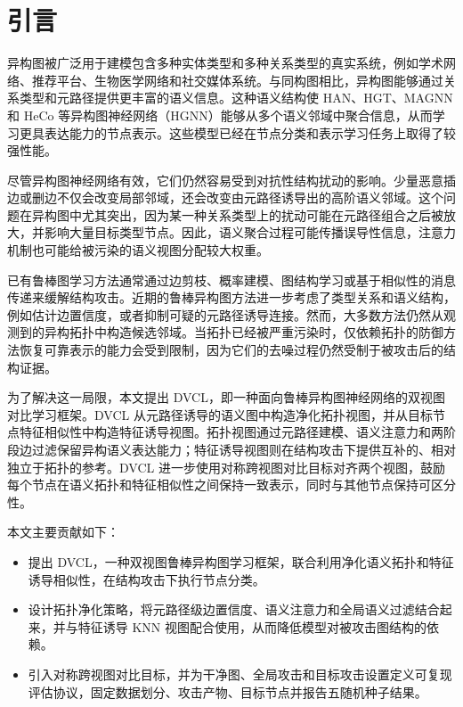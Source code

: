 \section{引言}
\label{sec:introduction-zh}

异构图被广泛用于建模包含多种实体类型和多种关系类型的真实系统，例如学术网络、推荐平台、生物医学网络和社交媒体系统。与同构图相比，异构图能够通过关系类型和元路径提供更丰富的语义信息。这种语义结构使 HAN、HGT、MAGNN 和 HeCo 等异构图神经网络（HGNN）能够从多个语义邻域中聚合信息，从而学习更具表达能力的节点表示。这些模型已经在节点分类和表示学习任务上取得了较强性能。

尽管异构图神经网络有效，它们仍然容易受到对抗性结构扰动的影响。少量恶意插边或删边不仅会改变局部邻域，还会改变由元路径诱导出的高阶语义邻域。这个问题在异构图中尤其突出，因为某一种关系类型上的扰动可能在元路径组合之后被放大，并影响大量目标类型节点。因此，语义聚合过程可能传播误导性信息，注意力机制也可能给被污染的语义视图分配较大权重。

已有鲁棒图学习方法通常通过边剪枝、概率建模、图结构学习或基于相似性的消息传递来缓解结构攻击。近期的鲁棒异构图方法进一步考虑了类型关系和语义结构，例如估计边置信度，或者抑制可疑的元路径诱导连接。然而，大多数方法仍然从观测到的异构拓扑中构造候选邻域。当拓扑已经被严重污染时，仅依赖拓扑的防御方法恢复可靠表示的能力会受到限制，因为它们的去噪过程仍然受制于被攻击后的结构证据。

为了解决这一局限，本文提出 DVCL，即一种面向鲁棒异构图神经网络的双视图对比学习框架。DVCL 从元路径诱导的语义图中构造净化拓扑视图，并从目标节点特征相似性中构造特征诱导视图。拓扑视图通过元路径建模、语义注意力和两阶段边过滤保留异构语义表达能力；特征诱导视图则在结构攻击下提供互补的、相对独立于拓扑的参考。DVCL 进一步使用对称跨视图对比目标对齐两个视图，鼓励每个节点在语义拓扑和特征相似性之间保持一致表示，同时与其他节点保持可区分性。

本文主要贡献如下：
\begin{itemize}
    \item 提出 DVCL，一种双视图鲁棒异构图学习框架，联合利用净化语义拓扑和特征诱导相似性，在结构攻击下执行节点分类。
    \item 设计拓扑净化策略，将元路径级边置信度、语义注意力和全局语义过滤结合起来，并与特征诱导 KNN 视图配合使用，从而降低模型对被攻击图结构的依赖。
    \item 引入对称跨视图对比目标，并为干净图、全局攻击和目标攻击设置定义可复现评估协议，固定数据划分、攻击产物、目标节点并报告五随机种子结果。
\end{itemize}
